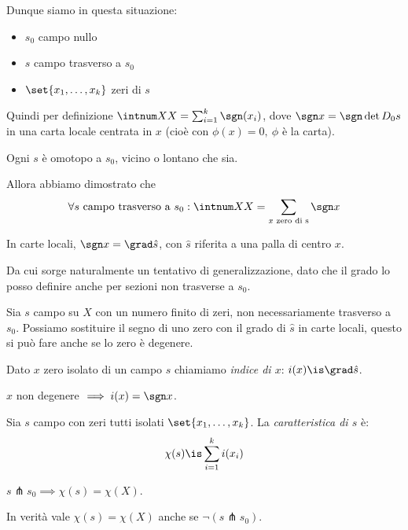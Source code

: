 \noindent Dunque siamo in questa situazione:
\begin{itemize}
	\item $s_0$ campo nullo
	\item $s$ campo trasverso a $s_0$
	\item $\set{x_1,\dots,x_k}$ zeri di $s$
\end{itemize}
Quindi per definizione $\intnum XX=\sum_{i=1}^k\sgn(x_i)$, dove $\sgn x=\sgn\det D_0s$ in una carta locale centrata in $x$ (cioè con $\phi(x) = 0, ~\phi$ è la carta).

\begin{oss}
	Ogni $s$ è omotopo a $s_0$, vicino o lontano che sia.
\end{oss}

\noindent Allora abbiamo dimostrato che
\[\forall s\text{ campo trasverso a }s_0:\intnum XX=\sum_{x\text{ zero di s}}\sgn x\]

\begin{oss}
	In carte locali, $\sgn x=\grad\hat s$\footnotemark, con $\hat s$ riferita a una palla di centro $x$.
\end{oss}

\noindent Da cui sorge naturalmente un tentativo di generalizzazione, dato che il grado lo posso definire anche per sezioni non trasverse a $s_0$.

Sia $s$ campo su $X$ con un numero finito di zeri, non necessariamente trasverso a $s_0$.
Possiamo sostituire il segno di uno zero con il grado di $\hat s$ in carte locali, questo si può fare anche se lo zero è degenere.

\begin{defn}
	Dato $x$ zero isolato di un campo $s$ chiamiamo \emph{indice di $x$}: $i(x)\is\grad\hat s$.
\end{defn}

\begin{oss}
	$x$ non degenere $\implies i(x)=\sgn x$.
\end{oss}

\begin{defn}
	Sia $s$ campo con zeri tutti isolati $\set{x_1,\dots,x_k}$. La \emph{caratteristica di $s$} è:
	\[\chi(s)\is\sum_{i=1}^ki(x_i)\]
\end{defn}

\begin{oss}
	$s\pitchfork s_0\implies\chi(s)=\chi(X)$.
\end{oss}

\begin{teo}[di Hopf]
	In verità vale $\chi(s)=\chi(X)$ anche se $\neg(s\pitchfork s_0)$.
\end{teo}

